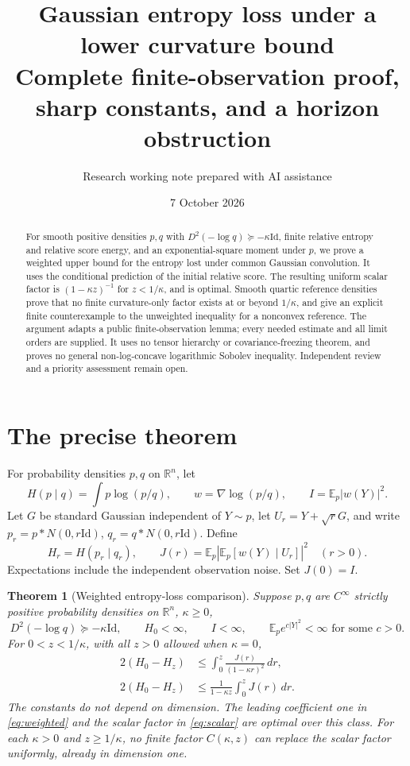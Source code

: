 \documentclass[11pt]{article}
\title{Gaussian entropy loss under a lower curvature bound\\\large Complete finite-observation proof, sharp constants, and a horizon obstruction}
\author{Research working note prepared with AI assistance}
\date{7 October 2026}
\newtheorem{theorem}{Theorem}[section]
\theoremstyle{remark}\newtheorem{remark}[theorem]{Remark}
\newcommand{\E}{\mathbb E}
\newcommand{\R}{\mathbb R}
\newcommand{\Id}{\mathrm{Id}}
\newcommand{\abs}[1]{\left|#1\right|}
\begin{document}
\maketitle
\begin{abstract}
For smooth positive densities $p,q$ with $D^2(-\log q)\succeq-\kappa\Id$, finite relative entropy and relative score energy, and an exponential-square moment under $p$, we prove a weighted upper bound for the entropy lost under common Gaussian convolution. It uses the conditional prediction of the initial relative score. The resulting uniform scalar factor is $(1-\kappa z)^{-1}$ for $z<1/\kappa$, and is optimal. Smooth quartic reference densities prove that no finite curvature-only factor exists at or beyond $1/\kappa$, and give an explicit finite counterexample to the unweighted inequality for a nonconvex reference. The argument adapts a public finite-observation lemma; every needed estimate and all limit orders are supplied. It uses no tensor hierarchy or covariance-freezing theorem, and proves no general non-log-concave logarithmic Sobolev inequality. Independent review and a priority assessment remain open.
\end{abstract}
\tableofcontents

\section{The precise theorem}
For probability densities $p,q$ on $\R^n$, let
\[
H(p\mid q)=\int p\log(p/q),\qquad
w=\nabla\log(p/q),\qquad I=\E_p|w(Y)|^2.
\]
Let $G$ be standard Gaussian independent of $Y\sim p$, let
$U_r=Y+\sqrt rG$, and write $p_r=p*N(0,r\Id)$, $q_r=q*N(0,r\Id)$.
Define
\[
H_r=H(p_r\mid q_r),\qquad
J(r)=\E_p\abs{\E_p[w(Y)\mid U_r]}^2 \quad(r>0).
\]
Expectations include the independent observation noise. Set $J(0)=I$.

\begin{theorem}[Weighted entropy-loss comparison]\label{thm:main}
Suppose $p,q$ are $C^\infty$ strictly positive probability densities on $\R^n$,
$\kappa\ge0$,
\[
D^2(-\log q)\succeq-\kappa\Id,\qquad
H_0<\infty,\qquad I<\infty,\qquad
\E_p e^{c|Y|^2}<\infty \text{ for some } c>0.
\]
For $0<z<1/\kappa$, with all $z>0$ allowed when $\kappa=0$,
\begin{align}
2(H_0-H_z)&\le\int_0^z\frac{J(r)}{(1-\kappa r)^2}\,dr,
\label{eq:weighted}\\
2(H_0-H_z)&\le\frac{1}{1-\kappa z}\int_0^z J(r)\,dr.
\label{eq:scalar}
\end{align}
The constants do not depend on dimension. The leading coefficient one in
\eqref{eq:weighted} and the scalar factor in \eqref{eq:scalar} are optimal
over this class. For each $\kappa>0$ and $z\ge1/\kappa$, no finite factor
$C(\kappa,z)$ can replace the scalar factor uniformly, already in dimension one.
\end{theorem}
\end{document}
